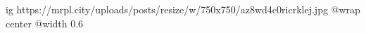  
 
 
 
 

\ifcmt
  ig https://mrpl.city/uploads/posts/resize/w/750x750/az8wd4c0ricrklej.jpg
  @wrap center
  @width 0.6
\fi
